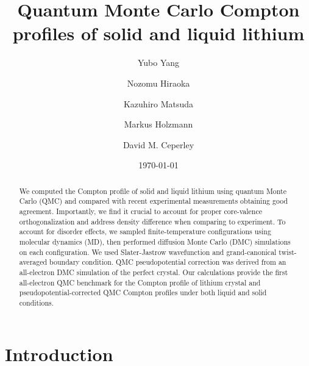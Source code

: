 \documentclass[aps,prb,showpacs,preprintnumbers,amsmath,amssymb,superscriptaddress,twocolumn]{revtex4-1}
\begin{document}
\title{Quantum Monte Carlo Compton profiles of solid and liquid lithium}
\author{Yubo Yang}
\author{Nozomu Hiraoka}
\author{Kazuhiro Matsuda}
\author{Markus Holzmann}
\author{David M. Ceperley}
\date{\today}
\begin{abstract}
We computed the Compton profile of solid and liquid lithium using quantum Monte Carlo (QMC) and compared with recent experimental measurements obtaining good agreement. Importantly, we find it crucial to account for proper core-valence orthogonalization and address density difference when comparing to experiment. To account for disorder effects, we sampled finite-temperature configurations using molecular dynamics (MD), then performed diffusion Monte Carlo (DMC) simulations on each configuration. We used Slater-Jastrow wavefunction and grand-canonical twist-averaged boundary condition. QMC pseudopotential correction was derived from an all-electron DMC simulation of the perfect crystal. Our calculations provide the first all-electron QMC benchmark for the Compton profile of lithium crystal and pseudopotential-corrected QMC Compton profiles under both liquid and solid conditions.
\end{abstract}
\pacs{}
\maketitle

\section{Introduction} \label{sec:intro}
\end{document}
